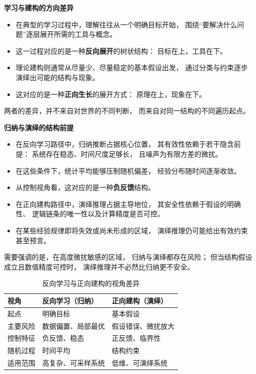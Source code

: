\documentclass[../main.tex]{subfiles}
\begin{document}
\begin{readingnote}
	\textbf{学习与建构的方向差异}
	
	\begin{itemize}
		\item 在典型的学习过程中，理解往往从一个明确目标开始，
		围绕“要解决什么问题”逐层展开所需的工具与概念。
		\item 这一过程对应的是一种\textbf{反向展开}的树状结构：
		目标在上，工具在下。
		\item 理论建构则通常从尽量少、尽量稳定的基本假设出发，
		通过分类与约束逐步演绎出可能的结构与现象。
		\item 这对应的是一种\textbf{正向生长}的展开方式：
		原理在上，现象在下。
	\end{itemize}
	
	两者的差异，并不来自对世界的不同判断，
	而来自对同一结构的不同遍历起点。
	
	\vspace{0.5em}
	\textbf{归纳与演绎的结构前提}
	
	\begin{itemize}
		\item 在反向学习路径中，归纳推断占据核心位置，
		其有效性依赖于若干隐含前提：
		系统存在稳态、时间尺度足够长，
		且噪声为有限方差的微扰。
		\item 在这些条件下，统计平均能够压制随机偏差，
		经验分布随时间逐渐收敛。
		\item 从控制视角看，这对应的是一种\textbf{负反馈}结构。
		\item 在正向建构路径中，演绎推理占据主导地位，
		其安全性依赖于假设的明确性、
		逻辑链条的唯一性以及计算精度是否可控。
		\item 在某些经验规律即将失效或尚未形成的区域，
		演绎推理仍可能给出有效约束甚至预言。
	\end{itemize}
	
	需要强调的是，在高度微扰敏感的区域，
	归纳与演绎都存在风险；
	但当结构假设成立且数值精度可控时，
	演绎推理并不必然比归纳更不安全。
\end{readingnote}



\begin{table}[h]
	\centering
	\caption{反向学习与正向建构的视角差异}
	\begin{tabular}{lll}
		\toprule
		视角 & 反向学习（归纳） & 正向建构（演绎） \\
		\midrule
		起点 & 明确目标 & 基本假设 \\
		主要风险 & 数据偏置、局部最优 & 假设错误、微扰放大 \\
		控制特征 & 负反馈、稳态 & 正反馈、临界性 \\
		随机过程 & 时间平均 & 结构约束 \\
		适用范围 & 高复杂、可采样系统 & 低维、可演绎系统 \\
		\bottomrule
	\end{tabular}
\end{table}
\end{document}
